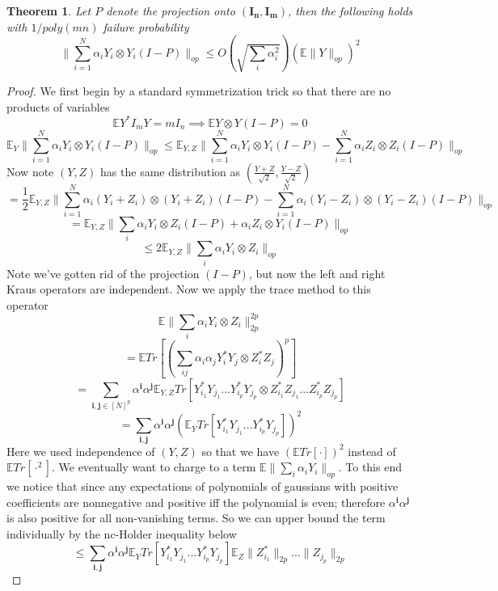 \documentclass{article}
\newtheorem{theorem}{Theorem}
\renewcommand{\vec}{\bm}
\newcommand{\E}{\mathbb{E}}
\begin{document}
\begin{theorem}
Let $P$ denote the projection onto $(\vec{I_{n}},\vec{I_{m}})$, then the following holds with $1/poly(mn)$ failure probability
\[ \|\sum_{i=1}^{N} \alpha_{i} Y_{i} \otimes Y_{i} (I - P) \|_{op} \leq O \left( \sqrt{\sum_{i} \alpha_{i}^{2}} \right) \left( \E \|Y\|_{op} \right)^{2} \]
\end{theorem}
\begin{proof}
We first begin by a standard symmetrization trick so that there are no products of variables
\[\E Y^{*} I_{m} Y = m I_{n} \implies \E Y \otimes Y (I-P) = 0\]
\[ \E_{Y} \|\sum_{i=1}^{N} \alpha_{i} Y_{i} \otimes Y_{i} (I - P)\|_{op} \leq \E_{Y,Z} \|\sum_{i=1}^{N} \alpha_{i} Y_{i} \otimes Y_{i} (I - P) - \sum_{i=1}^{N} \alpha_{i} Z_{i} \otimes Z_{i} (I - P) \|_{op}  \]
Now note $(Y,Z)$ has the same distribution as $(\frac{Y+Z}{\sqrt{2}},\frac{Y-Z}{\sqrt{2}})$
\[ = \frac{1}{2}\E_{Y,Z} \|\sum_{i=1}^{N} \alpha_{i} (Y_{i}+Z_{i}) \otimes (Y_{i}+Z_{i}) (I - P) - \sum_{i=1}^{N} \alpha_{i} (Y_{i}-Z_{i}) \otimes (Y_{i}-Z_{i}) (I - P) \|_{op}  \]
\[ = \E_{Y,Z} \|\sum_{i} \alpha_{i} Y_{i} \otimes Z_{i} (I-P) + \alpha_{i} Z_{i} \otimes Y_{i} (I-P)\|_{op}  \]
\[ \leq 2 \E_{Y,Z} \|\sum_{i} \alpha_{i} Y_{i} \otimes Z_{i}\|_{op}   \]
Note we've gotten rid of the projection $(I-P)$, but now the left and right Kraus operators are independent. Now we apply the trace method to this operator
\[ \E \|\sum_{i} \alpha_{i} Y_{i} \otimes Z_{i}\|_{2p}^{2p} \]
\[ = \E Tr [ \left( \sum_{ij} \alpha_{i} \alpha_{j} Y_{i}^{*} Y_{j} \otimes Z_{i}^{*} Z_{j} \right)^{p} ]  \]
\[ = \sum_{\vec{i},\vec{j} \in [N]^{p}} \alpha^{\vec{i}} \alpha^{\vec{j}} \E_{Y,Z} Tr [ Y_{i_{1}}^{*} Y_{j_{1}} ... Y_{i_{p}}^{*} Y_{j_{p}} \otimes Z_{i_{1}}^{*} Z_{j_{1}} ... Z_{i_{p}}^{*} Z_{j_{p}}  ]   \]
\[ = \sum_{\vec{i},\vec{j}} \alpha^{\vec{i}} \alpha^{\vec{j}} (\E_{Y} Tr [ Y_{i_{1}}^{*} Y_{j_{1}} ... Y_{i_{p}}^{*} Y_{j_{p}} ] )^{2}  \]
Here we used independence of $(Y,Z)$ so that we have $(\E Tr [ \cdot ] )^{2}$ instead of $\E Tr[ \cdot ^{2}]$. We eventually want to charge to a term $\E \|\sum_{i} \alpha_{i} Y_{i}\|_{op}$. To this end we notice that since any expectations of polynomials of gaussians with positive coefficients are nonnegative and positive iff the polynomial is even; therefore $\alpha^{\vec{i}} \alpha^{\vec{j}}$ is also positive for all non-vanishing terms. So we can upper bound the term individually by the nc-Holder inequality below
\[ \leq  \sum_{\vec{i},\vec{j}} \alpha^{\vec{i}} \alpha^{\vec{j}} \E_{Y} Tr [ Y_{i_{1}}^{*} Y_{j_{1}} ... Y_{i_{p}}^{*} Y_{j_{p}} ] \E_{Z} \|Z_{i_{1}}^{*}\|_{2p} ... \|Z_{j_{p}}\|_{2p}   \]

\end{proof}
\end{document}
